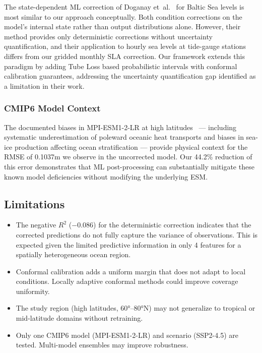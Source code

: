 \documentclass[conference]{IEEEtran}
\begin{document}
The state-dependent ML correction of Doganay et~al.~\cite{doganay2023} for Baltic Sea levels is most similar to our approach conceptually. Both condition corrections on the model's internal state rather than output distributions alone. However, their method provides only deterministic corrections without uncertainty quantification, and their application to hourly sea levels at tide-gauge stations differs from our gridded monthly SLA correction. Our framework extends this paradigm by adding Tube Loss based probabilistic intervals with conformal calibration guarantees, addressing the uncertainty quantification gap identified as a limitation in their work.

\subsubsection{CMIP6 Model Context}

The documented biases in MPI-ESM1-2-LR at high latitudes~\cite{mayer2024,wiese2024} --- including systematic underestimation of poleward oceanic heat transports and biases in sea-ice production affecting ocean stratification --- provide physical context for the RMSE of 0.1037m we observe in the uncorrected model. Our 44.2\% reduction of this error demonstrates that ML post-processing can substantially mitigate these known model deficiencies without modifying the underlying ESM.

\subsection{Limitations}

\begin{itemize}
    \item The negative $R^2$ ($-0.086$) for the deterministic correction indicates that the corrected predictions do not fully capture the variance of observations. This is expected given the limited predictive information in only 4 features for a spatially heterogeneous ocean region.
    \item Conformal calibration adds a uniform margin that does not adapt to local conditions. Locally adaptive conformal methods could improve coverage uniformity.
    \item The study region (high latitudes, 60°--80°N) may not generalize to tropical or mid-latitude domains without retraining.
    \item Only one CMIP6 model (MPI-ESM1-2-LR) and scenario (SSP2-4.5) are tested. Multi-model ensembles may improve robustness.
\end{itemize}
\end{document}
